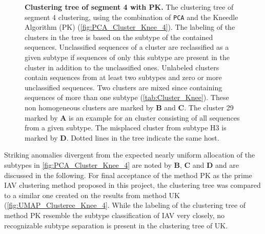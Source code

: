 \begin{figure}[!hbt]
    \caption[Clustering tree of segment 4 with PK]{\textbf{Clustering tree of segment 4 with PK.} The clustering tree of segment 4 clustering, using the combination of \texttt{PCA} and the Kneedle Algorithm (PK) (\autoref{fig:PCA_Cluster_Knee_4}). The labeling of the clusters in the tree is based on the subtype of the contained sequences. Unclassified sequences of a cluster are reclassified as a given subtype if sequences of only this subtype are present in the cluster in addition to the unclassified ones. Unlabeled clusters contain sequences from at least two subtypes and zero or more unclassified sequences. Two clusters are mixed since containing sequences of more than one subtype (\autoref{tab:Cluster_Knee}). These non homogeneous clusters are marked by \textbf{\textsf{B}} and \textbf{\textsf{C}}. The cluster 29 marked by \textbf{\textsf{A}} is an example for an cluster consisting of all sequences from a given subtype. The misplaced cluster from subtype H3 is marked by \textbf{\textsf{D}}. Dotted lines in the tree indicate the same host.}
    \label{fig:PCA_Clusteree_Knee_4}
\end{figure}

\vspace{1em}

Striking anomalies divergent from the expected nearly uniform allocation of the subtypes in \autoref{fig:PCA_Cluster_Knee_4} are noted by \textbf{\textsf{B}}, \textbf{\textsf{C}} and \textbf{\textsf{D}} and are discussed in the following. For final acceptance of the method PK as the prime \gls{IAV} clustering method proposed in this project, the clustering tree was compared to a similar one created on the results from method UK (\autoref{fig:UMAP_Clusteree_Knee_4}. While the labeling of the clustering tree of method PK resemble the subtype classification of \gls{IAV} very closely, no recognizable subtype separation is present in the clustering tree of UK. 
